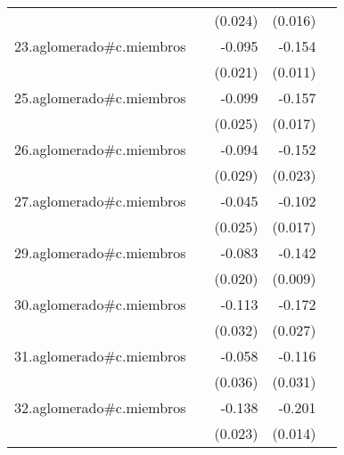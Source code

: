 {\begin{longtable}{l*{4}{D{.}{.}{-1}}}
            &                     &     (0.024)         &     (0.016)         &                     \\
\addlinespace
23.aglomerado#c.miembros&                     &      -0.095\sym{***}&      -0.154\sym{***}&                     \\
            &                     &     (0.021)         &     (0.011)         &                     \\
\addlinespace
25.aglomerado#c.miembros&                     &      -0.099\sym{***}&      -0.157\sym{***}&                     \\
            &                     &     (0.025)         &     (0.017)         &                     \\
\addlinespace
26.aglomerado#c.miembros&                     &      -0.094\sym{**} &      -0.152\sym{***}&                     \\
            &                     &     (0.029)         &     (0.023)         &                     \\
\addlinespace
27.aglomerado#c.miembros&                     &      -0.045         &      -0.102\sym{***}&                     \\
            &                     &     (0.025)         &     (0.017)         &                     \\
\addlinespace
29.aglomerado#c.miembros&                     &      -0.083\sym{***}&      -0.142\sym{***}&                     \\
            &                     &     (0.020)         &     (0.009)         &                     \\
\addlinespace
30.aglomerado#c.miembros&                     &      -0.113\sym{***}&      -0.172\sym{***}&                     \\
            &                     &     (0.032)         &     (0.027)         &                     \\
\addlinespace
31.aglomerado#c.miembros&                     &      -0.058         &      -0.116\sym{***}&                     \\
            &                     &     (0.036)         &     (0.031)         &                     \\
\addlinespace
32.aglomerado#c.miembros&                     &      -0.138\sym{***}&      -0.201\sym{***}&                     \\
            &                     &     (0.023)         &     (0.014)         &                     \\

\end{longtable}}
